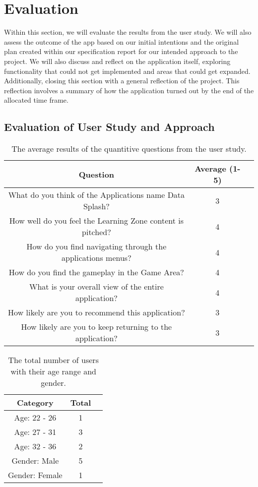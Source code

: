 \chapter{Evaluation}
	Within this section, we will evaluate the results from the user study. We will also assess the outcome of the app based on our initial intentions and the original plan created within our specification report for our intended approach to the project. We will also discuss and reflect on the application itself, exploring functionality that could not get implemented and areas that could get expanded. Additionally, closing this section with a general reflection of the project. This reflection involves a summary of how the application turned out by the end of the allocated time frame. 

	\section{Evaluation of User Study and Approach}
	
	\begin{table}[h!]
		\centering
			\begin{tabular}{|c|c|c }
				\hline
				Question & Average (1-5) \\ 
				\hline
				What do you think of the Applications name Data Splash? & 3 \\ 
				\hline 
				How well do you feel the Learning Zone content is pitched? & 4 \\
				\hline
				How do you find navigating through the applications menus? & 4 \\ 
				\hline 
				How do you find the gameplay in the Game Area? & 4 \\
				\hline
				What is your overall view of the entire application? & 4 \\ 
				\hline 
				How likely are you to recommend this application? & 3 \\
				\hline
				How likely are you to keep returning to the application? & 3 \\  
				\hline
			\end{tabular}
		\caption{The average results of the quantitive questions from the user study.}
		\label{table:results_avg}
	\end{table}
	
	\begin{table}[h!]
		\centering
		\begin{tabular}{|c|c|c }
			\hline
			Category & Total \\ 
			\hline
			Age: 22 - 26 & 1 \\ 
			\hline 
			Age: 27 - 31 & 3 \\
			\hline
			Age: 32 - 36 & 2 \\ 
			\hline 
			Gender: Male & 5 \\
			\hline
			Gender: Female & 1 \\ 
			\hline 
			
		\end{tabular}
		\caption{The total number of users with their age range and gender.}
		\label{table:results_age_gender}
	\end{table}


